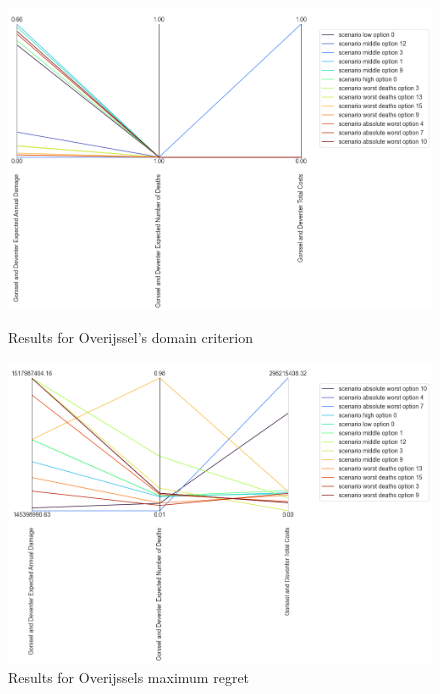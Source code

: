\begin{figure}[H]
  \centering
  \begin{minipage}[b]{0.4\textwidth}
    \includegraphics[width=1.15\textwidth]{report/figures/results/domain_criterion_Overijssel.png}
    \caption{Results for Overijssel's domain criterion}
    \label{fig:domain_criterion_Overijssels}
  \end{minipage}
  \hfill
  \begin{minipage}[b]{0.4\textwidth}
    \includegraphics[width=1.15\textwidth]{report/figures/results/regret_figure_Overijssel.png}
    \caption{Results for Overijssels maximum regret}
    \label{fig:regret_Overijssels}
  \end{minipage}
\end{figure}

